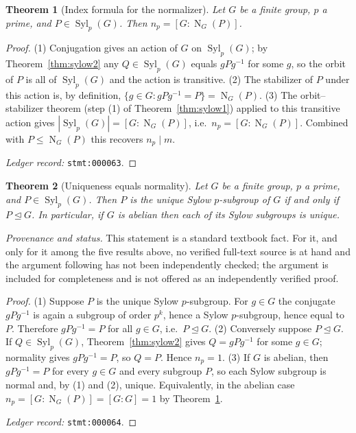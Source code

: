 \documentclass[11pt]{article}
\newtheorem{theorem}{Theorem}[section]
\theoremstyle{definition}
\theoremstyle{remark}
\newcommand{\Syl}{\operatorname{Syl}}
\newcommand{\Norm}{\operatorname{N}}
\begin{document}
\begin{theorem}[Index formula for the normalizer]\label{thm:index}
Let $G$ be a finite group, $p$ a prime, and $P\in\Syl_p(G)$. Then $n_p=[G:\Norm_G(P)]$.
\end{theorem}

\begin{proof}
(1) Conjugation gives an action of $G$ on $\Syl_p(G)$; by Theorem~\ref{thm:sylow2} any $Q\in\Syl_p(G)$ equals $gPg^{-1}$ for some $g$, so the orbit of $P$ is all of $\Syl_p(G)$ and the action is transitive.
(2) The stabilizer of $P$ under this action is, by definition, $\{g\in G: gPg^{-1}=P\}=\Norm_G(P)$.
(3) The orbit--stabilizer theorem (step (1) of Theorem~\ref{thm:sylow1}) applied to this transitive action gives $|\Syl_p(G)|=[G:\Norm_G(P)]$, i.e.\ $n_p=[G:\Norm_G(P)]$. Combined with $P\le\Norm_G(P)$ this recovers $n_p\mid m$.

\emph{Ledger record:} \texttt{stmt:000063}.
\end{proof}

\begin{theorem}[Uniqueness equals normality]\label{thm:unique}
Let $G$ be a finite group, $p$ a prime, and $P\in\Syl_p(G)$. Then $P$ is the unique Sylow $p$-subgroup of $G$ if and only if $P\trianglelefteq G$. In particular, if $G$ is abelian then each of its Sylow subgroups is unique.
\end{theorem}

\noindent\emph{Provenance and status.} This statement is a standard textbook fact. For it, and only for it among the five results above, no verified full-text source is at hand and the argument following has not been independently checked; the argument is included for completeness and is not offered as an independently verified proof.

\begin{proof}
(1) Suppose $P$ is the unique Sylow $p$-subgroup. For $g\in G$ the conjugate $gPg^{-1}$ is again a subgroup of order $p^{k}$, hence a Sylow $p$-subgroup, hence equal to $P$. Therefore $gPg^{-1}=P$ for all $g\in G$, i.e.\ $P\trianglelefteq G$.
(2) Conversely suppose $P\trianglelefteq G$. If $Q\in\Syl_p(G)$, Theorem~\ref{thm:sylow2} gives $Q=gPg^{-1}$ for some $g\in G$; normality gives $gPg^{-1}=P$, so $Q=P$. Hence $n_p=1$.
(3) If $G$ is abelian, then $gPg^{-1}=P$ for every $g\in G$ and every subgroup $P$, so each Sylow subgroup is normal and, by (1) and (2), unique. Equivalently, in the abelian case $n_p=[G:\Norm_G(P)]=[G:G]=1$ by Theorem~\ref{thm:index}.

\emph{Ledger record:} \texttt{stmt:000064}.
\end{proof}
\end{document}
